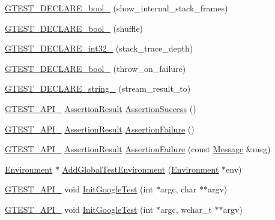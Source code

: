 \begin{DoxyCompactItemize}
\item 
\hyperlink{namespacetesting_af37b9206b938bb8b7d398a1379eb7482}{G\+T\+E\+S\+T\+\_\+\+D\+E\+C\+L\+A\+R\+E\+\_\+bool\+\_\+} (show\+\_\+internal\+\_\+stack\+\_\+frames)
\item 
\hyperlink{namespacetesting_a6d87f7374e105483905a305328856f4b}{G\+T\+E\+S\+T\+\_\+\+D\+E\+C\+L\+A\+R\+E\+\_\+bool\+\_\+} (shuffle)
\item 
\hyperlink{namespacetesting_adba6f8afa0f8695956d0134f1629a10b}{G\+T\+E\+S\+T\+\_\+\+D\+E\+C\+L\+A\+R\+E\+\_\+int32\+\_\+} (stack\+\_\+trace\+\_\+depth)
\item 
\hyperlink{namespacetesting_ac69f2aeeb84dc5f49bd3d040a6f32d17}{G\+T\+E\+S\+T\+\_\+\+D\+E\+C\+L\+A\+R\+E\+\_\+bool\+\_\+} (throw\+\_\+on\+\_\+failure)
\item 
\hyperlink{namespacetesting_ad4d1ea63037fc21018dbe997cb0041d1}{G\+T\+E\+S\+T\+\_\+\+D\+E\+C\+L\+A\+R\+E\+\_\+string\+\_\+} (stream\+\_\+result\+\_\+to)
\item 
\hyperlink{gtest-port_8h_aa73be6f0ba4a7456180a94904ce17790}{G\+T\+E\+S\+T\+\_\+\+A\+P\+I\+\_\+} \hyperlink{classtesting_1_1_assertion_result}{Assertion\+Result} \hyperlink{namespacetesting_ac1d0baedb17286c5c6c87bd1a45da8ac}{Assertion\+Success} ()
\item 
\hyperlink{gtest-port_8h_aa73be6f0ba4a7456180a94904ce17790}{G\+T\+E\+S\+T\+\_\+\+A\+P\+I\+\_\+} \hyperlink{classtesting_1_1_assertion_result}{Assertion\+Result} \hyperlink{namespacetesting_a75cb789614cb1c28c34627a4a3c053df}{Assertion\+Failure} ()
\item 
\hyperlink{gtest-port_8h_aa73be6f0ba4a7456180a94904ce17790}{G\+T\+E\+S\+T\+\_\+\+A\+P\+I\+\_\+} \hyperlink{classtesting_1_1_assertion_result}{Assertion\+Result} \hyperlink{namespacetesting_a6bdf82adf159dcda822d75746937ffa9}{Assertion\+Failure} (const \hyperlink{classtesting_1_1_message}{Message} \&msg)
\item 
\hyperlink{classtesting_1_1_environment}{Environment} $\ast$ \hyperlink{namespacetesting_a460d7b998622e332392c1e00be3a60d5}{Add\+Global\+Test\+Environment} (\hyperlink{classtesting_1_1_environment}{Environment} $\ast$env)
\item 
\hyperlink{gtest-port_8h_aa73be6f0ba4a7456180a94904ce17790}{G\+T\+E\+S\+T\+\_\+\+A\+P\+I\+\_\+} void \hyperlink{namespacetesting_afd726ae08c9bd16dc52f78c822d9946b}{Init\+Google\+Test} (int $\ast$argc, char $\ast$$\ast$argv)
\item 
\hyperlink{gtest-port_8h_aa73be6f0ba4a7456180a94904ce17790}{G\+T\+E\+S\+T\+\_\+\+A\+P\+I\+\_\+} void \hyperlink{namespacetesting_ae5a88709a4a7529e30c83242156556b3}{Init\+Google\+Test} (int $\ast$argc, wchar\+\_\+t $\ast$$\ast$argv)

\end{DoxyCompactItemize}
